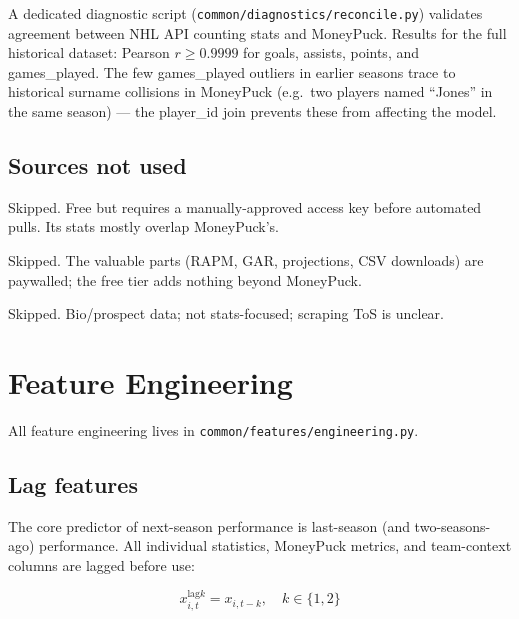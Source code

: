 \documentclass[11pt, a4paper]{article}
\begin{document}
A dedicated diagnostic script (\texttt{common/diagnostics/reconcile.py}) validates agreement
between NHL API counting stats and MoneyPuck. Results for the full historical dataset:
Pearson $r \geq 0.9999$ for goals, assists, points, and games\_played. The few
games\_played outliers in earlier seasons trace to historical surname collisions in MoneyPuck
(e.g.\ two players named ``Jones'' in the same season) — the player\_id join prevents these
from affecting the model.

\subsection{Sources not used}

\begin{description}[leftmargin=2cm, style=nextline]
  \item[Natural Stat Trick] Skipped. Free but requires a manually-approved access key before
        automated pulls. Its stats mostly overlap MoneyPuck's.
  \item[Evolving-Hockey] Skipped. The valuable parts (RAPM, GAR, projections, CSV downloads)
        are paywalled; the free tier adds nothing beyond MoneyPuck.
  \item[Elite Prospects] Skipped. Bio/prospect data; not stats-focused; scraping ToS is unclear.
\end{description}


\section{Feature Engineering}
\label{sec:features}

All feature engineering lives in \texttt{common/features/engineering.py}.

\subsection{Lag features}

The core predictor of next-season performance is last-season (and two-seasons-ago) performance.
All individual statistics, MoneyPuck metrics, and team-context columns are lagged before use:

\begin{equation}
  x_{i,t}^{\text{lag}k} = x_{i,t-k}, \quad k \in \{1, 2\}
\end{equation}
\end{document}

